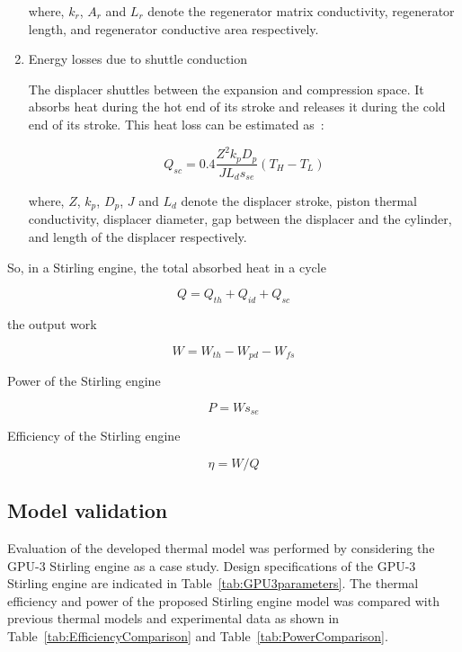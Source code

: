 \begin{enumerate}
where, $k_r$, $A_r$ and $L_r$ denote the regenerator matrix conductivity, regenerator length, and regenerator conductive area respectively.

\item Energy losses due to shuttle conduction

The displacer shuttles between the expansion and compression space. It absorbs heat during the hot end of its stroke and releases it during the cold end of its stroke. This heat loss can be estimated as~\cite{Timoumi2008}:

\begin{equation}
	Q_{sc} = 0.4\frac{Z^2k_pD_p}{JL_ds_{se}}(T_{H} - T_{L})
\end{equation}

where, $Z$, $k_p$, $D_p$, $J$ and $L_d$ denote the displacer stroke, piston thermal conductivity, displacer diameter, gap between the displacer and the cylinder, and length of the displacer respectively.

\end{enumerate}

So, in a Stirling engine, the total absorbed heat in a cycle

\begin{equation}
	Q = Q_{th} + Q_{id} + Q_{sc}
\end{equation}

the output work

\begin{equation}
	W = W_{th} - W_{pd} - W_{fs}
\end{equation}

Power of the Stirling engine

\begin{equation}
	P = Ws_{se}
	\label{Eq:P}
\end{equation}

Efficiency of the Stirling engine

\begin{equation}
	\eta = W/Q
	\label{Eq:eta}
\end{equation}


\subsection{Model validation}

Evaluation of the developed thermal model was performed by considering the GPU-3 Stirling engine as a case study. Design specifications of the GPU-3 Stirling engine are indicated in Table~\ref{tab:GPU3parameters}. The thermal efficiency and power of the proposed Stirling engine model was compared with previous thermal models and experimental data as shown in Table~\ref{tab:EfficiencyComparison} and Table~\ref{tab:PowerComparison}.

